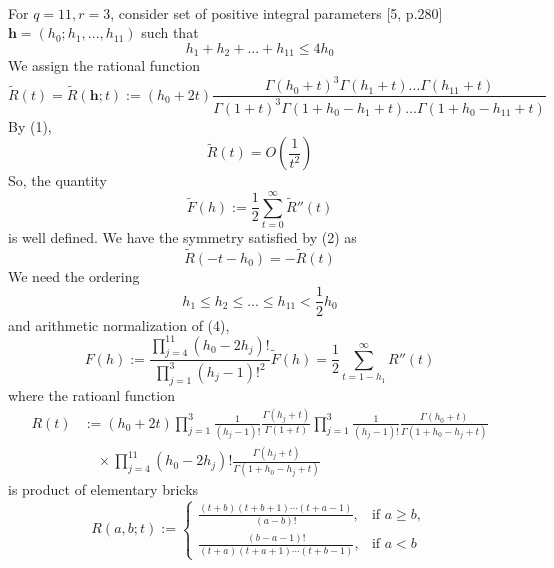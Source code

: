 \documentclass[12pt]{article}
\begin{document}
\\
For $q=11, r=3$, consider set of positive integral parameters [5, p.280] $\boldsymbol{h}=(h_0;h_1,...,h_{11})$ such that \begin{equation}
    h_1+h_2+...+h_{11}\leq 4 h_0
\end{equation} We assign the rational function \begin{equation}
    \widetilde{R}(t)=\widetilde{R}(\boldsymbol{h};t):=(h_0+2t)\frac{\Gamma(h_0+t)^3\Gamma(h_1+t)...\Gamma(h_{11}+t)}{\Gamma(1+t)^3\Gamma(1+h_0-h_1+t)...\Gamma(1+h_0-h_{11}+t)}
\end{equation}
By (1), \begin{equation}
    \widetilde{R}(t)=O\left(\frac{1}{t^2}\right)
\end{equation}
So, the quantity \begin{equation}
    \widetilde{F}(h):= \frac{1}{2}\sum_{t=0}^\infty  \widetilde{R}''(t)
\end{equation}
is well defined. We have the symmetry satisfied by (2) as \begin{equation}
    \widetilde{R}(-t-h_0)= -\widetilde{R}(t)
\end{equation} We need the ordering \begin{equation}
    h_1\leq h_2\leq...\leq h_{11}<\frac{1}{2} h_0
\end{equation}
and arithmetic normalization of (4), 
\begin{equation}
    F(h):=\frac{\prod_{j=4}^{11}(h_0-2h_j)!}{\prod_{j=1}^{3}(h_j-1)!^2} \widetilde{F}(h)=\frac{1}{2}\sum_{t=1-h_1}^\infty R''(t)
\end{equation}
where the ratioanl function \begin{equation}
\begin{aligned}
R(t) &:=(h_0+2t)
\prod_{j=1}^3 \frac{1}{(h_j-1)!}
\frac{\Gamma(h_j+t)}{\Gamma(1+t)}
\prod_{j=1}^3 \frac{1}{(h_j-1)!}
\frac{\Gamma(h_0+t)}{\Gamma(1+h_0-h_j+t)} \\[2mm]
&\quad{}\times
\prod_{j=4}^{11} (h_0-2h_j)!
\frac{\Gamma(h_j+t)}{\Gamma(1+h_0-h_j+t)}
\end{aligned}
\end{equation}
is product of elementary bricks
\begin{equation*}
R(a,b;t):=
\begin{cases}
\displaystyle
\frac{(t+b)(t+b+1)\cdots(t+a-1)}{(a-b)!},
& \text{if } a\geq b, \\[3mm]
\displaystyle
\frac{(b-a-1)!}{(t+a)(t+a+1)\cdots(t+b-1)},
& \text{if } a<b
\end{cases}
\end{equation*}
\end{document}
